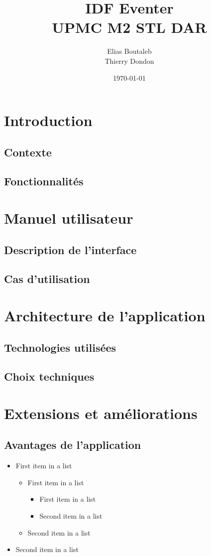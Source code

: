 \documentclass[11pt,a4paper,sans]{report}
\title{IDF Eventer \\ UPMC M2 STL DAR}
\author{Elias Boutaleb \\ Thierry Dondon}
\date{\today}
\begin{document}
\maketitle
\tableofcontents

\chapter{Introduction}
\section{Contexte}
\section{Fonctionnalités}

\chapter{Manuel utilisateur}
\section{Description de l'interface}
\section{Cas d'utilisation}

\chapter{Architecture de l'application}
\section{Technologies utilisées}
\section{Choix techniques}

\chapter{Extensions et améliorations}
\section{Avantages de l'application}
\begin{itemize}
    \item First item in a list
        \begin{itemize}
            \item First item in a list
                \begin{itemize}
                    \item First item in a list
                    \item Second item in a list
                \end{itemize}
            \item Second item in a list
        \end{itemize}
    \item Second item in a list
\end{itemize}
\end{document}
